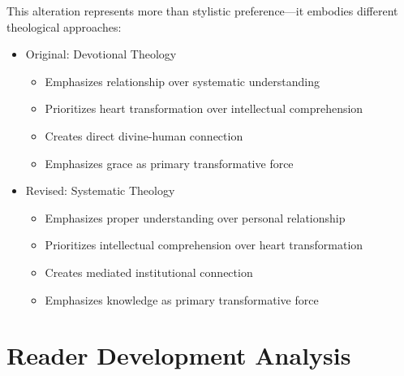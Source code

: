 \documentclass[11pt,twoside]{book}
\begin{document}
This alteration represents more than stylistic preference—it embodies different theological approaches:
\begin{itemize}
\item Original: Devotional Theology
\label{sec:orgbdd4baf}
\begin{itemize}
\item Emphasizes relationship over systematic understanding
\item Prioritizes heart transformation over intellectual comprehension
\item Creates direct divine-human connection
\item Emphasizes grace as primary transformative force
\end{itemize}
\item Revised: Systematic Theology
\label{sec:orge3b5f47}
\begin{itemize}
\item Emphasizes proper understanding over personal relationship
\item Prioritizes intellectual comprehension over heart transformation
\item Creates mediated institutional connection
\item Emphasizes knowledge as primary transformative force
\end{itemize}
\end{itemize}
\section*{Reader Development Analysis}
\label{sec:orged5066d}
\end{document}
